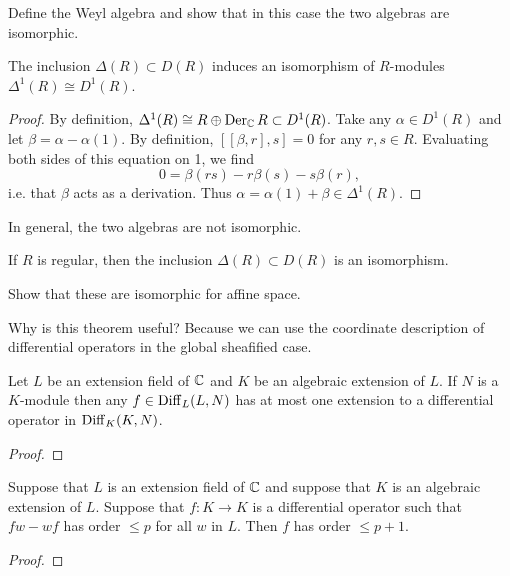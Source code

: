 \begin{example}
    Define the Weyl algebra and show that in this case the two algebras are
    isomorphic.
\end{example}

\begin{lemma}
    The inclusion $\Delta(R)\subset D(R)$ induces an isomorphism of
    $R$-modules $\Delta^1(R)\cong D^1(R)$.
    \label{label:firstorder}
\end{lemma}
\begin{proof}
    By definition, $\Delta^1(R)\cong R\oplus\operatorname{Der}_{\mathbb{C}} R\subset D^1(R)$. Take any $\alpha\in D^1(R)$
    and let $\beta=\alpha-\alpha(1)$. By definition, $[ [\beta,r],s]=0$ for any $r,s\in R$.
    Evaluating both sides of this equation on 1, we find
    \[0 = \beta(rs)-r\beta(s)-s\beta(r),\]
    i.e. that $\beta$ acts as a derivation. Thus $\alpha=\alpha(1)+\beta\in\Delta^1(R)$.
\end{proof}

\begin{example}
    In general, the two algebras are not isomorphic.
\end{example}

\begin{theorem}
    If $R$ is regular, then the inclusion $\Delta(R)\subset D(R)$ is an isomorphism.
    \label{label:derivationiso}
\end{theorem}

\begin{example}
    Show that these are isomorphic for affine space.
\end{example}

Why is this theorem useful? Because we can use the coordinate description of differential
operators in the global sheafified case.

\begin{lemma}
    Let $L$ be an extension field of $\mathbb{C}$ and $K$ be an algebraic extension of $L$. If
    $N$ is a $K$-module then any $f\in\operatorname{Diff}_L(L,N)$ has at most one extension to a
    differential operator in $\operatorname{Diff}_K(K,N)$.
    \label{lemma:hart1}
\end{lemma}
\begin{proof}
\end{proof}

\begin{corollary}
    Suppose that $L$ is an extension field of $\mathbb{C}$ and suppose that $K$ is an algebraic
    extension of $L$. Suppose that $f:K\to K$ is a differential operator such that $fw-wf$
    has order $\leqslant p$ for all $w$ in $L$. Then $f$ has order $\leqslant p+1$.
\end{corollary}
\begin{proof}
\end{proof}

